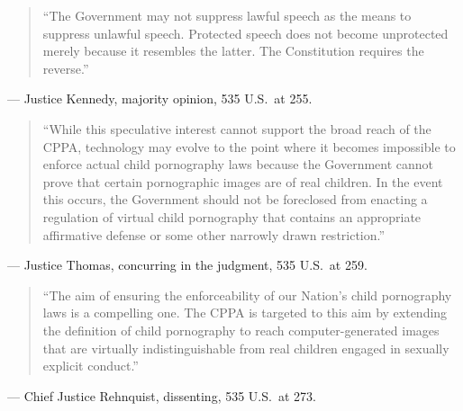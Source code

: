 \documentclass[12pt]{article}
\begin{document}
\begin{quote}
``The Government may not suppress lawful speech as the means to suppress unlawful speech. Protected speech does not become unprotected merely because it resembles the latter. The Constitution requires the reverse.''
\end{quote}
\noindent --- Justice Kennedy, majority opinion, 535 U.S.\ at 255.

\begin{quote}
``While this speculative interest cannot support the broad reach of the CPPA, technology may evolve to the point where it becomes impossible to enforce actual child pornography laws because the Government cannot prove that certain pornographic images are of real children. In the event this occurs, the Government should not be foreclosed from enacting a regulation of virtual child pornography that contains an appropriate affirmative defense or some other narrowly drawn restriction.''
\end{quote}
\noindent --- Justice Thomas, concurring in the judgment, 535 U.S.\ at 259.

\begin{quote}
``The aim of ensuring the enforceability of our Nation's child pornography laws is a compelling one. The CPPA is targeted to this aim by extending the definition of child pornography to reach computer-generated images that are virtually indistinguishable from real children engaged in sexually explicit conduct.''
\end{quote}
\noindent --- Chief Justice Rehnquist, dissenting, 535 U.S.\ at 273.
\end{document}
